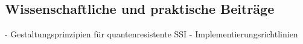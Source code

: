 \subsection{Wissenschaftliche und praktische Beiträge} \label{sec:Wissenschaftliche und praktische Beiträge}

- Gestaltungsprinzipien für quantenresistente SSI
- Implementierungsrichtlinien